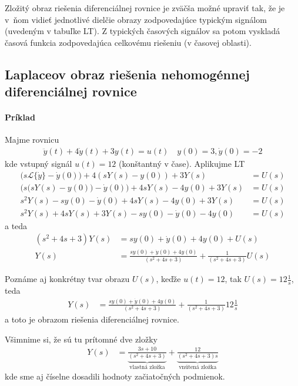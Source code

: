 \documentclass[a4paper, 10pt, ]{article}
\begin{document}
Zložitý obraz riešenia diferenciálnej rovnice je zväčša možné upraviť tak, že je v~ňom vidieť jednotlivé dielčie obrazy zodpovedajúce typickým signálom (uvedeným v tabuľke LT). Z typických časových signálov sa potom vyskladá časová funkcia zodpovedajúca celkovému riešeniu (v časovej oblasti).





\subsection{Laplaceov obraz riešenia nehomogénnej diferenciálnej rovnice}

\paragraph{Príklad}

Majme rovnicu
\begin{align}
    \ddot y(t) +4 \dot y(t) + 3y(t) = u(t) \quad y(0) = 3, \dot y(0) = -2
\end{align}
kde vstupný signál $u(t) = 12$ (konštantný v čase). Aplikujme LT
\begin{align}
    \big( s \mathcal L \{\dot y\} - \dot y(0) \big) + 4 \left( sY(s) - y(0) \right) + 3 Y(s) &=  U(s) \\
    \Big( s \big( sY(s) - y(0) \big) - \dot y(0) \Big) + 4sY(s) - 4y(0) + 3Y(s) &= U(s) \\
    s^2Y(s) - sy(0) - \dot y(0)  + 4sY(s) - 4y(0) + 3Y(s) &= U(s) \\
    s^2Y(s)   + 4sY(s)  + 3Y(s) - sy(0) - \dot y(0) - 4y(0) &= U(s)
\end{align}
a teda
\begin{align}
    \left( s^2   + 4s  + 3\right)Y(s) &= sy(0) +  \dot y(0) + 4y(0) + U(s) \\
    Y(s) &= \frac{sy(0) +  \dot y(0) + 4y(0)}{\left( s^2   + 4s  + 3\right)} + \frac{1}{\left( s^2   + 4s  + 3\right)}U(s)
\end{align}

Poznáme aj konkrétny tvar obrazu $U(s)$, keďže $u(t) = 12$, tak $U(s) = 12 \frac{1}{s}$, teda
\begin{align}
    Y(s) &= \frac{sy(0) +  \dot y(0) + 4y(0)}{\left( s^2   + 4s  + 3\right)} + \frac{1}{\left( s^2   + 4s  + 3\right)} 12 \frac{1}{s}
\end{align}
a toto je obrazom riešenia diferenciálnej rovnice.

Všimnime si, že sú tu prítomné dve zložky
\begin{align} \label{vvzlozky}
    Y(s)
    &=
    \underbrace{
    \frac{3s + 10}{\left( s^2   + 4s  + 3\right)}
    }_{\text{vlastná zložka}}
    +
    \underbrace{
    \frac{12}{\left( s^2   + 4s  + 3\right) s}
    }_{\text{vnútená zložka}}
\end{align}
kde sme aj číselne dosadili hodnoty začiatočných podmienok.
\end{document}
